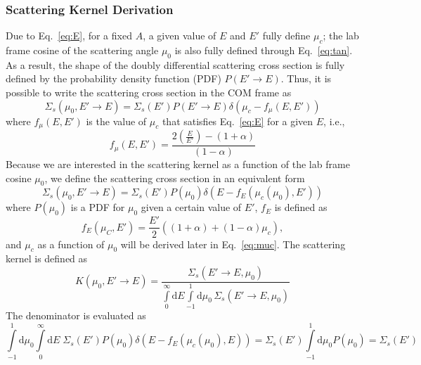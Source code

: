 \documentclass[12pt]{article}
\renewcommand{\d}{\mathrm{d}}
\newcommand{\ra}{\rightarrow}
\newenvironment{solution}[1][Solution]{\begin{trivlist}
\item[\hskip \labelsep {\bfseries #1} {\hspace{-0.2em}\bfseries:}]\hspace{0.3in}\newline}{\end{trivlist}}
\begin{document}
\begin{solution}

    \subsubsection*{Scattering Kernel Derivation}

Due to Eq.~\eqref{eq:E}, for a fixed $A$, a given value of $E$ and $E'$ fully define
$\mu_c$; the lab frame cosine of the scattering angle $\mu_0$ is also fully defined through
Eq.~\eqref{eq:tan}.  As a result, the shape of the doubly differential scattering cross section
 is fully defined by the probability density function (PDF) $P(E'\ra E)$. Thus, it is
possible to write the scattering cross section in the COM frame as~\cite{dunnshultis}
\begin{equation}
    \Sigma_s(\mu_0,E'\ra E) = \Sigma_s(E')P(E' \ra E) \delta(\mu_c - f_\mu(E,E'))
 \end{equation}
 where $f_\mu(E,E')$ is the value of $\mu_c$ that satisfies Eq.~\eqref{eq:E} for a given
 $E$, i.e.,
 \begin{equation}
     f_\mu(E,E') = \frac{2(\frac{E}{E'}) - (1+\alpha)}{(1-\alpha)}
 \end{equation}
Because we are interested in the scattering kernel as a function of the lab frame
cosine $\mu_0$, 
we define the scattering cross section in an equivalent form 
 \begin{equation}
     \Sigma_s(\mu_0,E'\ra E) = \Sigma_s(E')P(\mu_0)\delta(E - f_{E}(\mu_c(\mu_0),E'))
 \end{equation}
 where $P(\mu_0)$ is a PDF for $\mu_0$ given a certain value of $E'$, $f_E$ is
 defined as
 \begin{equation}
  f_E(\mu_C,E') = \frac{E'}{2}\left((1+\alpha) + (1-\alpha)\mu_c\right),
 \end{equation}
 and $\mu_c$ as a function of $\mu_0$ will be derived later in Eq.~\eqref{eq:muc}. The scattering kernel is defined as
 \begin{equation}
     K(\mu_0,E'\ra E) = \frac{\Sigma_s(E'\ra E,\mu_0)}{\displaystyle\int\limits_{0}^\infty\d
     E\!\int\limits_{-1}^1 \d \mu_0\,
 \Sigma_s(E'\ra E,\mu_0)}
 \end{equation}
 The denominator is evaluated as
 \begin{equation}
     \int\limits_{-1}^1 \!\d \mu_0 \int\limits_0^\infty \!\d E \;
     \Sigma_s(E')P(\mu_0)\delta(E-f_{E}(\mu_c(\mu_0),E)) =
     \Sigma_s(E')\int\limits_{-1}^1 \d\mu_0 P(\mu_0) = \Sigma_s(E')
 \end{equation}

\end{solution}
\end{document}

